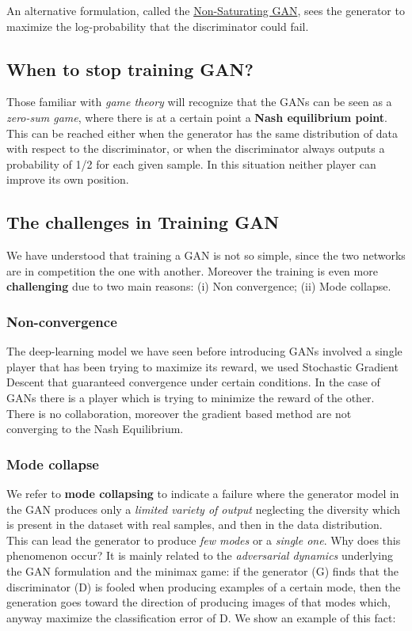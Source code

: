 An alternative formulation, called the \underline{Non-Saturating GAN}, sees the generator to maximize the log-probability that the discriminator could fail. 

\subsection{When to stop training GAN?}
Those familiar with \textit{game theory} will recognize that the GANs can be seen as a \textit{zero-sum game}, where there is at a certain point a \textbf{Nash equilibrium point}. This can be reached either when the generator has the same distribution of data with respect to the discriminator, or when the discriminator always outputs a probability of 1/2 for each given sample. In this situation neither player can improve its own position.

\subsection{The challenges in Training GAN}
We have understood that training a GAN is not so simple, since the two networks are in competition the one with another. Moreover the training is even more \textbf{challenging} due to two main reasons: (i) Non convergence; (ii) Mode collapse.

\subsubsection{Non-convergence}
The deep-learning model we have seen before introducing GANs involved a single player that has been trying to maximize its reward, we used Stochastic Gradient Descent that guaranteed convergence under certain conditions. In the case of GANs there is a player which is trying to minimize the reward of the other. There is no collaboration, moreover the gradient based method are not converging to the Nash Equilibrium.

\subsubsection{Mode collapse}
We refer to \textbf{mode collapsing} to indicate a failure where the generator model in the GAN produces only a \textit{limited variety of output} neglecting the diversity which is present in the dataset with real samples, and then in the data distribution. This can lead the generator to produce  \textit{few modes} or a \textit{single one}. Why does this phenomenon occur? It is mainly related to the \textit{adversarial dynamics} underlying the GAN formulation and the minimax game: if the generator (G) finds that the discriminator (D) is fooled when producing examples of a certain mode, then the generation goes toward the direction of producing images of that modes which, anyway maximize the classification error of D. We show an example of this fact: 


